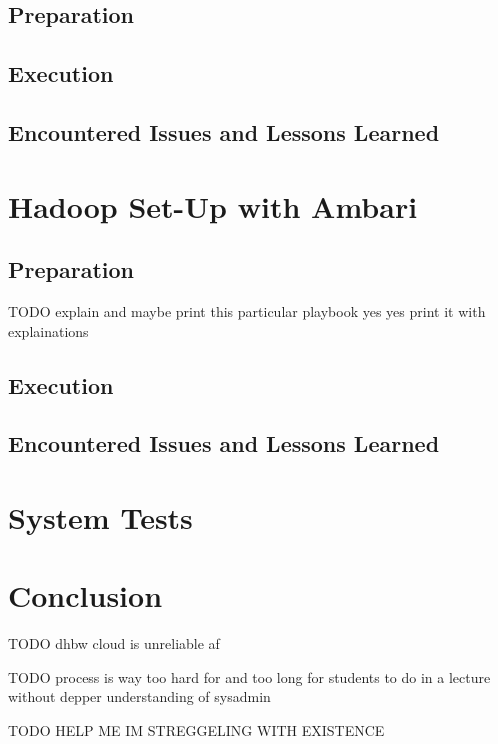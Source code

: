 \subsection{Preparation}

\subsection{Execution}

\subsection{Encountered Issues and Lessons Learned}


\section{Hadoop Set-Up with Ambari}

\subsection{Preparation}

TODO explain and maybe print this particular playbook yes yes print it with explainations

\subsection{Execution}

\subsection{Encountered Issues and Lessons Learned}

\section{System Tests}

\section{Conclusion}

TODO dhbw cloud is unreliable af

TODO process is way too hard for and too long for students to do in a lecture without depper understanding of sysadmin  



TODO HELP ME IM STREGGELING WITH EXISTENCE



